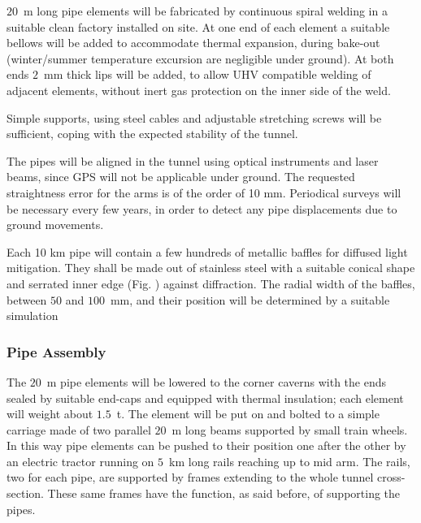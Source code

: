 $20$~m long pipe elements will be fabricated by continuous spiral welding in a suitable clean factory installed on site. At one end of each element a suitable bellows will be added to accommodate thermal expansion, during bake-out (winter/summer temperature excursion are negligible under ground). At both ends $2$~mm thick lips will be added, to allow UHV compatible welding of adjacent elements, without inert gas protection on the inner side of the weld. 

Simple supports, using steel cables and adjustable stretching screws will be sufficient, coping with the expected stability of the tunnel. 

The pipes will be aligned in the tunnel using optical instruments and laser beams, since GPS will not be applicable under ground. The requested straightness error for the arms is of the order of 10 mm. Periodical surveys will be necessary every few years, in order to detect any pipe displacements due to ground movements. 

Each 10 km pipe will contain a few hundreds of metallic baffles for diffused light mitigation. They shall be made out of stainless steel with a suitable conical shape and serrated inner edge (Fig. %
) against diffraction. The radial width of the baffles, between $50$ and $100$~mm, and their position will be determined by a suitable simulation %

\subsubsection{Pipe Assembly} 
The $20$~m pipe elements will be lowered to the corner caverns with the ends sealed by suitable end-caps and equipped with thermal insulation; each element will weight about $1.5$~t. The element will be put on and bolted to a simple carriage made of two parallel $20$~m long beams supported by small train wheels. In this way pipe elements can be pushed to their position one after the other by an electric tractor running on $5$~km long rails reaching up to mid arm. The rails, two for each pipe, are supported by frames extending to the whole tunnel cross-section. These same frames have the function, as said before, of supporting the pipes. 

